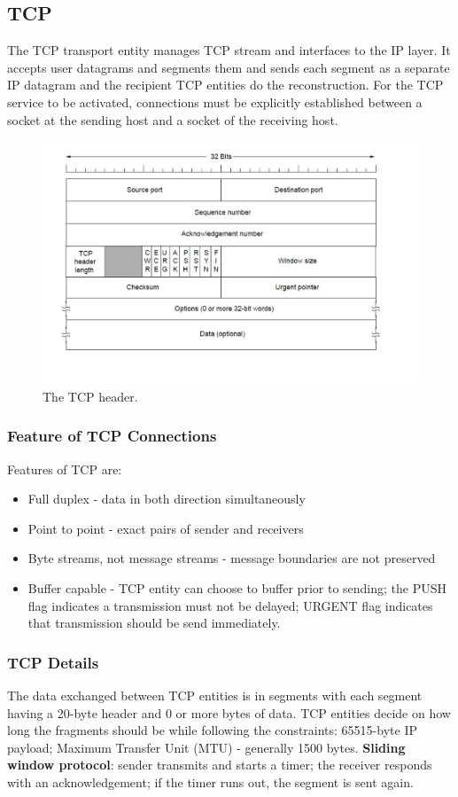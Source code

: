 \documentclass[twoside]{article}
\begin{document}
\subsection{TCP}
The TCP transport entity manages TCP stream and interfaces to the IP layer. It
accepts user datagrams and segments them and sends each segment as a separate
IP datagram and the recipient TCP entities do the reconstruction. For the TCP
service to be activated, connections must be explicitly established between
a socket at the sending host and a socket of the receiving host.
\begin{figure}
  \includegraphics[width=\linewidth]{tcp-header.png}
  \caption{The TCP header.}
  \label{fig:tcp-header}
\end{figure}
\subsubsection{Feature of TCP Connections}
Features of TCP are:
\begin{itemize}
    \item Full duplex - data in both direction simultaneously
    \item Point to point - exact pairs of sender and receivers
    \item Byte streams, not message streams - message boundaries are not
    preserved
    \item Buffer capable - TCP entity can choose to buffer prior to sending; 
    the PUSH flag indicates a transmission must not be delayed; URGENT flag
    indicates that transmission should be send immediately.
\end{itemize}
\subsubsection{TCP Details}
The data exchanged between TCP entities is in segments with each segment 
having a 20-byte header and 0 or more bytes of data. TCP entities decide
on how long the fragments should be while following the constraints: 65515-byte
IP payload; Maximum Transfer Unit (MTU) - generally 1500 bytes. \textbf{Sliding
window protocol}: sender transmits and starts a timer; the receiver responds 
with an acknowledgement; if the timer runs out, the segment is sent again.
\end{document}
